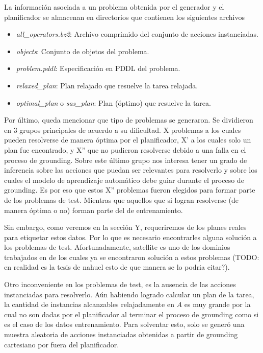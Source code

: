 La información asociada a un problema obtenida por el generador y el planificador se almacenan en directorios que contienen los siguientes archivos

\begin{itemize}
    \item \emph{all\_operators.bz2}: Archivo comprimido del conjunto de acciones instanciadas.
    \item \emph{objects}: Conjunto de objetos del problema.
    \item \emph{problem.pddl}: Especificación en PDDL del problema.
    \item \emph{relaxed\_plan}: Plan relajado que resuelve la tarea relajada.
    \item \emph{optimal\_plan} o \emph{sas\_plan}: Plan (óptimo) que resuelve la tarea.
\end{itemize}

Por último, queda mencionar que tipo de problemas se generaron. Se dividieron en 3 grupos principales de acuerdo a su dificultad. X problemas a los cuales pueden resolverse de manera óptima por el planificador, X' a los cuales solo un plan fue encontrado, y X'' que no pudieron resolverse debido a una falla en el proceso de grounding. Sobre este último grupo nos interesa tener un grado de inferencia sobre las acciones que puedan ser relevantes para resolverlo y sobre los cuales el modelo de aprendizaje automático debe guiar durante el proceso de grounding. Es por eso que estos X'' problemas fueron elegidos para formar parte de los problemas de test. Mientras que aquellos que si logran resolverse (de manera óptima o no) forman parte del de entrenamiento.

Sin embargo, como veremos en la sección Y, requeriremos de los planes reales para etiquetar estos datos. Por lo que es necesario encontrarles alguna solución a los problemas de test. Afortunadamente, satellite es uno de los dominios trabajados en \citep{Gnad_Torralba_Dominguez_Areces_Bustos_2019} de los cuales ya se encontraron solución a estos problemas (TODO: en realidad es la tesis de nahuel esto de que manera se lo podria citar?).

Otro inconveniente en los problemas de test, es la ausencia de las acciones instanciadas para resolverlo. Aún habiendo logrado calcular un plan de la tarea, la cantidad de instancias alcanzables relajadamente en $A$ es muy grande por la cual no son dadas por el planificador al terminar el proceso de grounding como si es el caso de los datos entrenamiento. Para solventar esto, solo se generó una muestra aleatoria de acciones instanciadas obtenidas a partir de grounding cartesiano por fuera del planificador.

